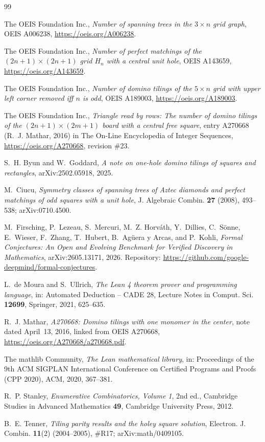 \documentclass[11pt]{amsart}
\theoremstyle{plain}
\theoremstyle{definition}
\begin{document}
{\footnotesize
\begin{thebibliography}{99}

The OEIS Foundation Inc., \emph{Number of spanning trees in the $3\times n$ grid graph}, OEIS A006238, \url{https://oeis.org/A006238}.

The OEIS Foundation Inc., \emph{Number of perfect matchings of the $(2n+1)\times(2n+1)$ grid $H_n$ with a central unit hole}, OEIS A143659, \url{https://oeis.org/A143659}.

The OEIS Foundation Inc., \emph{Number of domino tilings of the $5\times n$ grid with upper left corner removed iff $n$ is odd}, OEIS A189003, \url{https://oeis.org/A189003}.

The OEIS Foundation Inc., \emph{Triangle read by rows: The number of domino tilings of the $(2n+1)\times(2m+1)$ board with a central free square}, entry A270668 (R.~J. Mathar, 2016) in The On-Line Encyclopedia of Integer Sequences, \url{https://oeis.org/A270668}, revision \#23.

S.~H. Byun and W.~Goddard, \emph{A note on one-hole domino tilings of squares and rectangles}, arXiv:2502.05918, 2025.

M.~Ciucu, \emph{Symmetry classes of spanning trees of Aztec diamonds and perfect matchings of odd squares with a unit hole}, J. Algebraic Combin. \textbf{27} (2008), 493--538; arXiv:0710.4500.

M.~Firsching, P.~Lezeau, S.~Mercuri, M.~Z. Horv\'ath, Y.~Dillies, C.~S\"onne, E.~Wieser, F.~Zhang, T.~Hubert, B.~Ag\"uera y Arcas, and P.~Kohli, \emph{Formal Conjectures: An Open and Evolving Benchmark for Verified Discovery in Mathematics}, arXiv:2605.13171, 2026. Repository: \url{https://github.com/google-deepmind/formal-conjectures}.

L.~de Moura and S.~Ullrich, \emph{The Lean 4 theorem prover and programming language}, in: Automated Deduction -- CADE 28, Lecture Notes in Comput. Sci. \textbf{12699}, Springer, 2021, 625--635.

R.~J. Mathar, \emph{A270668: Domino tilings with one monomer in the center}, note dated April~13, 2016, linked from OEIS A270668, \url{https://oeis.org/A270668/a270668.pdf}.

The mathlib Community, \emph{The Lean mathematical library}, in: Proceedings of the 9th ACM SIGPLAN International Conference on Certified Programs and Proofs (CPP 2020), ACM, 2020, 367--381.

R.~P. Stanley, \emph{Enumerative Combinatorics, Volume 1}, 2nd ed., Cambridge Studies in Advanced Mathematics \textbf{49}, Cambridge University Press, 2012.

B.~E. Tenner, \emph{Tiling parity results and the holey square solution}, Electron. J. Combin. \textbf{11}(2) (2004--2005), \#R17; arXiv:math/0409105.

\end{thebibliography}
}
\end{document}
